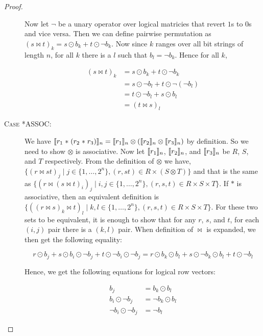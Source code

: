 \begin{proof}
\begin{description}
    Now let $\neg$ be a unary operator over logical matricies that revert $1$s
    to $0$s and vice versa. Then we can define pairwise permutation as
    $(s \bowtie t)_k = s \odot b_k + t \odot \neg b_k$. Now since $k$ ranges
    over all bit strings of length $n$, for all $k$ there is a $l$ such that
    $b_l = \neg b_k$. Hence for all $k$,

    \begin{align*}
      (s \bowtie t)_k &= s \odot b_k + t \odot \neg b_k \\
                      &= s \odot \neg b_l + t \odot \neg (\neg b_l) \\
                      &= t \odot \neg b_l + s \odot b_l \\
                      &= (t \bowtie s)_l
    \end{align*}

  \item[\textsc{Case *ASSOC}:] We have $\llbracket{r_1 \; \texttt{$\ast$} \;
    (r_2 \; \texttt{$\ast$} \; r_3)}\rrbracket_n = \llbracket{r_1}\rrbracket_n \otimes (\llbracket{r_2}\rrbracket_n
    \otimes \llbracket{r_3}\rrbracket_n)$ by definition. So we need to show $\otimes$ is
    associative. Now let $\llbracket{r_1}\rrbracket_n$, $\llbracket{r_2}\rrbracket_n$, and
    $\llbracket{r_3}\rrbracket_n$ be $R$, $S$, and $T$ respectively. From the definition of
    $\otimes$ we have, $\{ (r \bowtie st)_j \mid j \in \{ 1, \ldots, 2^n\},
    (r, st) \in R \times (S \otimes T) \}$ and that is the same as
    $\{ (r \bowtie (s \bowtie t)_i)_j \mid i,j \in \{ 1, \ldots, 2^n \}, (r,s,t)
    \in R \times S \times T \}$. If $\ast$ is associative, then an equivalent
    definition is $\{ ((r \bowtie s)_k \bowtie t)_l \mid k,l \in \{ 1, \ldots,
    2^n \}, (r,s,t) \in R \times S \times T \}$. For these two sets to be
    equivalent, it is enough to show that for any $r$, $s$, and $t$, for each
    $(i,j)$ pair there is a $(k,l)$ pair. When definition of $\bowtie$ is
    expanded, we then get the following equality:

    $$r \odot b_j + s \odot b_i \odot \neg b_j + t \odot \neg b_i \odot \neg b_j
    = r \odot b_k \odot b_l + s \odot \neg b_k \odot b_l + t \odot \neg b_l$$

    Hence, we get the following equations for logical row vectors:

    \begin{align}
      b_j & = b_k \odot b_l \\
      b_i \odot \neg b_j & = \neg b_k \odot b_l \\
      \neg b_i \odot \neg b_j & = \neg b_l
    \end{align}


\end{description}
\end{proof}
